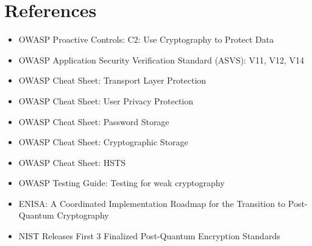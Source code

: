 \documentclass[11pt]{article}
\begin{document}
\section{References}
\begin{itemize}
  \item OWASP Proactive Controls: C2: Use Cryptography to Protect Data
  \item OWASP Application Security Verification Standard (ASVS): V11, V12, V14
  \item OWASP Cheat Sheet: Transport Layer Protection
  \item OWASP Cheat Sheet: User Privacy Protection
  \item OWASP Cheat Sheet: Password Storage
  \item OWASP Cheat Sheet: Cryptographic Storage
  \item OWASP Cheat Sheet: HSTS
  \item OWASP Testing Guide: Testing for weak cryptography
  \item ENISA: A Coordinated Implementation Roadmap for the Transition to Post-Quantum Cryptography
  \item NIST Releases First 3 Finalized Post-Quantum Encryption Standards
\end{itemize}

\newpage
\end{document}
